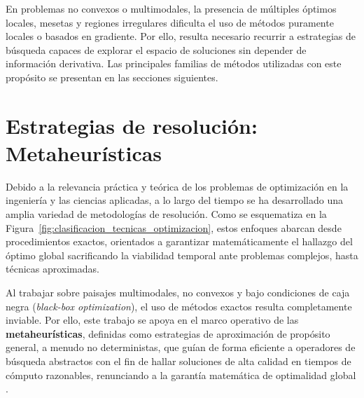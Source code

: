 En problemas no convexos o multimodales, la presencia de múltiples óptimos locales, mesetas y regiones irregulares dificulta el uso de métodos puramente locales o basados en gradiente. Por ello, resulta necesario recurrir a estrategias de búsqueda capaces de explorar el espacio de soluciones sin depender de información derivativa. Las principales familias de métodos utilizadas con este propósito se presentan en las secciones siguientes.

\section{Estrategias de resolución: Metaheurísticas}

Debido a la relevancia práctica y teórica de los problemas de optimización en la ingeniería y las ciencias aplicadas, a lo largo del tiempo se ha desarrollado una amplia variedad de metodologías de resolución. Como se esquematiza en la Figura~\ref{fig:clasificacion_tecnicas_optimizacion}, estos enfoques abarcan desde procedimientos exactos, orientados a garantizar matemáticamente el hallazgo del óptimo global sacrificando la viabilidad temporal ante problemas complejos, hasta técnicas aproximadas.

Al trabajar sobre paisajes multimodales, no convexos y bajo condiciones de caja negra (\textit{black-box optimization}), el uso de métodos exactos resulta completamente inviable. Por ello, este trabajo se apoya en el marco operativo de las \textbf{metaheurísticas}, definidas como estrategias de aproximación de propósito general, a menudo no deterministas, que guían de forma eficiente a operadores de búsqueda abstractos con el fin de hallar soluciones de alta calidad en tiempos de cómputo razonables, renunciando a la garantía matemática de optimalidad global \cite{talbi2009metaheuristics}.

